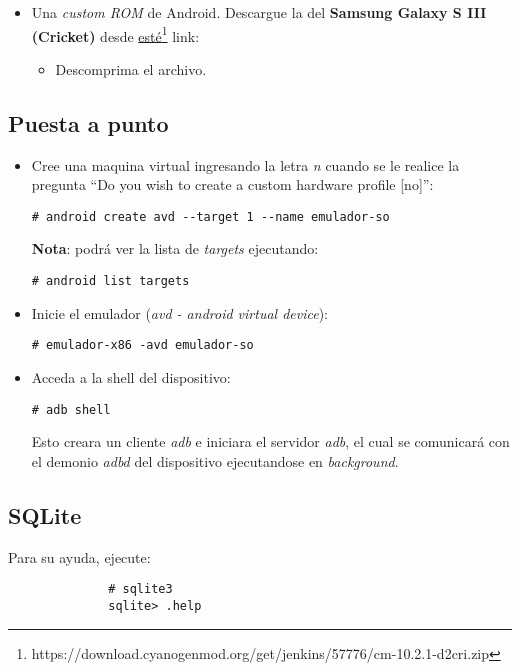 \begin{itemize}
 \item Una \textit{custom ROM} de Android. Descargue la del \textbf{Samsung Galaxy S III (Cricket)} desde \href{https://download.cyanogenmod.org/get/jenkins/57776/cm-10.2.1-d2cri.zip}{esté}\footnote{https://download.cyanogenmod.org/get/jenkins/57776/cm-10.2.1-d2cri.zip} link:
 \begin{itemize}
      \item Descomprima el archivo.
 \end{itemize} 
\end{itemize}


\subsection{Puesta a punto}
\begin{itemize}
    \item Cree una maquina virtual ingresando la letra \textit{n} cuando se le realice la pregunta ``Do you wish to create a custom hardware profile [no]'':
    \begin{lstlisting}
# android create avd --target 1 --name emulador-so
    \end{lstlisting}
    \textbf{Nota}: podrá ver la lista de \textit{targets} ejecutando:
    \begin{lstlisting}
# android list targets
    \end{lstlisting}
    
    \item Inicie el emulador (\textit{avd - android virtual device}):
    \begin{lstlisting}
# emulador-x86 -avd emulador-so
    \end{lstlisting}

    \item Acceda a la shell del dispositivo:
    \begin{lstlisting}
# adb shell
    \end{lstlisting}
    Esto creara un cliente \textit{adb} e iniciara el servidor \textit{adb}, el cual se comunicará con el demonio \textit{adbd} del dispositivo ejecutandose en \textit{background}.
\end{itemize}

\subsection{SQLite}
Para su ayuda, ejecute:
\begin{lstlisting}
		      # sqlite3
		      sqlite> .help
\end{lstlisting}

